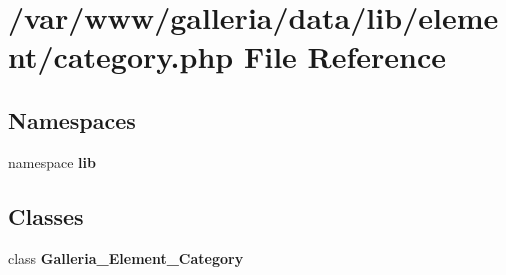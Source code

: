 \section{/var/www/galleria/data/lib/element/category.php File Reference}
\label{category_8php}
\subsection*{Namespaces}
\begin{CompactItemize}
\item 
namespace {\bf lib}
\end{CompactItemize}
\subsection*{Classes}
\begin{CompactItemize}
\item 
class {\bf Galleria\_\-Element\_\-Category}
\end{CompactItemize}
